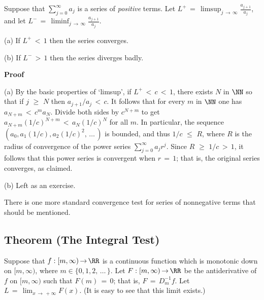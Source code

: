 \V

        Suppose that $\sum_{j=0}^{{\infty}} a_{j}$ is a series of {\em positive} terms.
    Let ${\displaystyle L^{+} \,=\, {\limsup}_{j \,{\rightarrow}\, {\infty}} \frac{a_{j+1}}{a_{j}}}$,
    and let ${\displaystyle L^{-} \,=\, {\liminf}_{j \,{\rightarrow}\, {\infty}} \frac{a_{j+1}}{a_{j}}}$.

\V

        (a) If $L^{+}\,<\,1$ then the series converges.

\V

        (b) If $L^{-}\,>\,1$ then the series diverges badly.

\V

        {\bf Proof}

\V

        (a) By the basic properties of `limsup', if $L^{+}\,<\,c\,<\,1$, there exists $N$ in ${\NN}$ so that if $j\,\,{\geq}\,\,N$ then $a_{j+1}/a_{j}\,<\,c$.
    It follows that for every $m$ in ${\NN}$ one has $a_{N+m}\,<\,c^{m}a_{N}$.
    Divide both sides by $c^{N+m}$ to get $a_{N+m}(1/c)^{N+m}\,<\,a_{N}(1/c)^{N}$ for all $m$. In particular, the sequence $\left(a_{0}, a_{1}(1/c), a_{2}(1/c)^{2}, \,{\ldots}\,\right)$ is bounded, and thus $1/c\,\,{\leq}\,\,R$, where $R$ is the radius of convergence of the power series $\sum_{j=0}^{{\infty}} a_{j}r^{j}$.
    Since $R\,\,{\geq}\,\,1/c\,>\,1$, it follows that this power series is convergent when $r \,=\, 1$; that is, the original series converges, as claimed.

\V

        (b) Left as an exercise.

\V
\V

        There is one more standard convergence test for series of nonnegative terms that should be mentioned.

\V

        \subsection{\small{{\bf Theorem}} (The Integral Test)}
        \label{ThmG50.100}

\V

        Suppose that $f:[m,{\infty}) \,{\rightarrow}\, {\RR}$ is a continuous function which is monotonic down on $[m,{\infty})$, where $m{\in}\{0,1,2,\,{\ldots}\,\}$.
    Let $F:[m,{\infty}) \,{\rightarrow}\, {\RR}$ be the antiderivative of $f$ on $[m,{\infty})$ such that $F(m) \,=\, 0$; that is, $F \,=\, D^{-1}_{m} f$.
    Let $L \,=\, \lim_{x \,{\rightarrow}\, +{\infty}} F(x)$.
    (It is easy to see that this limit exists.)

